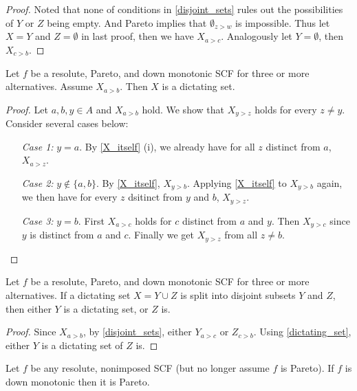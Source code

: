 \begin{proof}
    Noted that none of conditions in \cref{disjoint_sets} rules out the possibilities of $Y$ or $Z$ being empty. And Pareto implies that $\emptyset_{z>w}$ is impossible. Thus let $X = Y$ and $Z = \emptyset$ in last proof, then we have $X_{a>c}$. Analogously let $Y = \emptyset$, then $X_{c>b}$.
\end{proof}

\begin{lemma}
    \label{dictating_set}
    Let $f$ be a resolute, Pareto, and down monotonic SCF for three or more alternatives. Assume $X_{a>b}$. Then $X$ is a dictating set.
\end{lemma}

\begin{proof}
    Let $a,b,y\in A$ and $X_{a>b}$ hold. We show that $X_{y>z}$ holds for every $z \neq y$. Consider several cases below:
    \begin{itemize}
        \item[\textit{Case 1:}] $y = a$. By \cref{X_itself} (i), we already have for all $z$ distinct from $a$, $X_{a>z}$.
        \item[\textit{Case 2:}] $y \not \in \{a,b\}$. By \cref{X_itself}, $X_{y>b}$. Applying \cref{X_itself} to $X_{y>b}$ again, we then have for every $z$ dsitinct from $y$ and $b$, $X_{y>z}$.
        \item[\textit{Case 3:}] $y = b$. First $X_{a>c}$ holds for $c$ distinct from $a$ and $y$. Then $X_{y>c}$ since $y$ is distinct from $a$ and $c$. Finally we get $X_{y>z}$ from all $z \neq b$.
    \end{itemize}
\end{proof}

\begin{lemma}
    \label{splitting_lemma}
    Let $f$ be a resolute, Pareto, and down monotonic SCF for three or more alternatives. If a dictating set $X = Y \cup Z$ is split into disjoint subsets $Y$ and $Z$, then either $Y$ is a dictating set, or $Z$ is.
\end{lemma}

\begin{proof}
    Since $X_{a>b}$, by \cref{disjoint_sets}, either $Y_{a>c}$ or $Z_{c>b}$. Using \cref{dictating_set}, either $Y$ is a dictating set of $Z$ is.
\end{proof}

\begin{lemma}
    \label{Adjustment_lemma}
    Let $f$ be any resolute, nonimposed SCF (but no longer assume $f$ is Pareto). If $f$ is down monotonic then it is Pareto.
\end{lemma}

